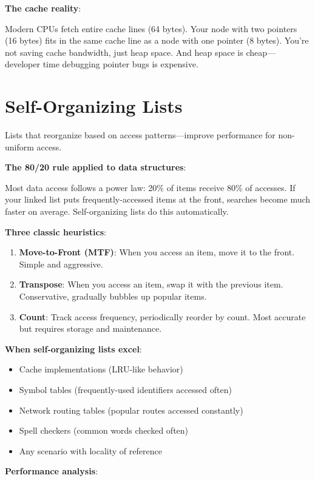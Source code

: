 \textbf{The cache reality}:

Modern CPUs fetch entire cache lines (64 bytes). Your node with two pointers (16 bytes) fits in the same cache line as a node with one pointer (8 bytes). You're not saving cache bandwidth, just heap space. And heap space is cheap---developer time debugging pointer bugs is expensive.

\section{Self-Organizing Lists}

Lists that reorganize based on access patterns---improve performance for non-uniform access.

\textbf{The 80/20 rule applied to data structures}:

Most data access follows a power law: 20\% of items receive 80\% of accesses. If your linked list puts frequently-accessed items at the front, searches become much faster on average. Self-organizing lists do this automatically.

\textbf{Three classic heuristics}:

\begin{enumerate}
    \item \textbf{Move-to-Front (MTF)}: When you access an item, move it to the front. Simple and aggressive.
    \item \textbf{Transpose}: When you access an item, swap it with the previous item. Conservative, gradually bubbles up popular items.
    \item \textbf{Count}: Track access frequency, periodically reorder by count. Most accurate but requires storage and maintenance.
\end{enumerate}

\textbf{When self-organizing lists excel}:
\begin{itemize}
    \item Cache implementations (LRU-like behavior)
    \item Symbol tables (frequently-used identifiers accessed often)
    \item Network routing tables (popular routes accessed constantly)
    \item Spell checkers (common words checked often)
    \item Any scenario with locality of reference
\end{itemize}

\textbf{Performance analysis}:

